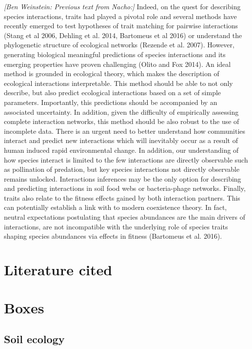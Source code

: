 \emph{{[}Ben Weinstein: Previous text from Nacho:{]}} Indeed, on the quest for
describing species interactions, traits had played a pivotal role and several
methods have recently emerged to test hypotheses of trait matching for pairwise
interactions (Stang et al 2006, Dehling et al. 2014, Bartomeus et al 2016) or
understand the phylogenetic structure of ecological networks (Rezende et al.
2007). However, generating biological meaningful predictions of species
interactions and its emerging properties have proven challenging (Olito and Fox
2014). An ideal method is grounded in ecological theory, which makes the
description of ecological interactions interpretable. This method should be able
to not only describe, but also predict ecological interactions based on a set of
simple parameters. Importantly, this predictions should be accompanied by an
associated uncertainty. In addition, given the difficulty of empirically
assessing complete interaction networks, this method should be also robust to
the use of incomplete data. There is an urgent need to better understand how
communities interact and predict new interactions which will inevitably occur as
a result of human induced rapid environmental change. In addition, our
understanding of how species interact is limited to the few interactions are
directly observable such as pollination of predation, but key species
interactions not directly observable remains unlocked. Interactions inferences
may be the only option for describing and predicting interactions in soil food
webs or bacteria-phage networks. Finally, traits also relate to the fitness
effects gained by both interaction partners. This can potentially establish a
link with to modern coexistence theory. In fact, neutral expectations
postulating that species abundances are the main drivers of interactions, are
not incompatible with the underlying role of species traits shaping species
abundances via effects in fitness (Bartomeus et al. 2016).

\section{Literature cited}\label{literature-cited}



\section{Boxes}\label{potential-boxes}

\subsection{Soil ecology}\label{soil-ecology}

